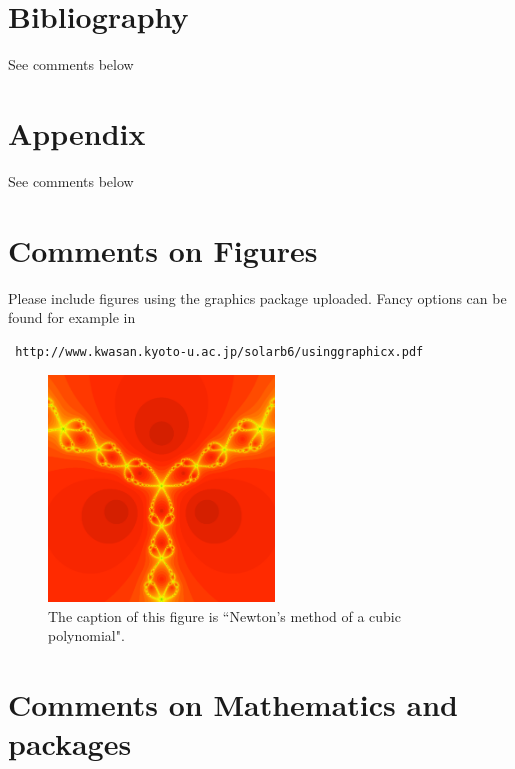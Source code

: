 \documentclass[12,twoside]{TFG-GCED}
\begin{document}
\section*{Bibliography}

See comments below
\section*{Appendix}

See comments below



\section*{Comments on Figures}

Please include figures using the graphics package uploaded.  Fancy options can be found for example in  \begin{verbatim} http://www.kwasan.kyoto-u.ac.jp/solarb6/usinggraphicx.pdf \end{verbatim}

\begin{figure}[htb!]
\begin{center}
\includegraphics[width=6cm]{samplefigure.pdf}
\end{center}
\caption{\label{sample figure} \small The caption of this figure is ``Newton's method of a cubic polynomial".}
\end{figure}

\section*{ Comments on Mathematics and packages} \label{packages}
\end{document}
